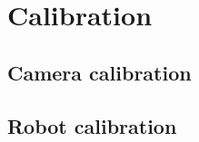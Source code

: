 \chapter{Calibration} %
\label{cha:calibration}

\section{Camera calibration} %
\label{sec:camera_calibration}


\section{Robot calibration} %
\label{sec:robot_calibration}


